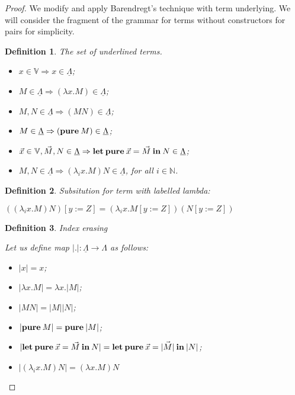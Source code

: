 \documentclass[a4paper]{article}
\newtheorem{defin}{Definition}
\begin{document}
\begin{proof}

  We modify and apply Barendregt's technique with term underlying. We will consider the fragment of the grammar for terms without
  constructors for pairs for simplicity.

\begin{defin} The set of underlined terms.

  \begin{itemize}
    \item $x \in \mathbb{V} \Rightarrow x \in \underline{\Lambda}$;
    \item $M \in \underline{\Lambda} \Rightarrow (\lambda x. M) \in \underline{\Lambda}$;
    \item $M, N \in \underline{\Lambda} \Rightarrow (M N) \in \underline{\Lambda}$;
    \item $M \in \underline{\Lambda} \Rightarrow ({\bf pure \:} M) \in \underline{\Lambda}$;
    \item $\vec{x} \in \mathbb{V}, \vec{M}, N \in \underline{\Lambda} \Rightarrow {\bf let \: pure \:} \vec{x} = \vec{M} {\: \bf in \:} N \in \underline{\Lambda}$;
    \item $M, N \in \underline{\Lambda} \Rightarrow (\lambda_i x. M) N \in \underline{\Lambda}$, for all $i \in \mathbb{N}$.
  \end{itemize}
\end{defin}

\begin{defin} Subsitution for term with labelled lambda:

  $((\lambda_i x. M) N) [y := Z] = (\lambda_i x. M [y := Z]) (N [y := Z])$
\end{defin}

\begin{defin} Index erasing

  Let us define map $|.| : \underline{\Lambda} \to \Lambda$ as follows:

  \begin{itemize}
    \item $|x| = x$;
    \item $|\lambda x. M| = \lambda x. |M|$;
    \item $|M N| = |M| |N|$;
    \item $|{\bf pure \:} M| = {\bf pure \:} |M|$;
    \item $|{\bf let \: pure \:} \vec{x} = \vec{M} {\: \bf in \:} N| = {\bf let \: pure \:} \vec{x} = \vec{|M|} {\: \bf in \:} |N|$;
    \item $|(\lambda_i x. M) N| = (\lambda x. M) N$
  \end{itemize}
\end{defin}


\end{proof}
\end{document}
